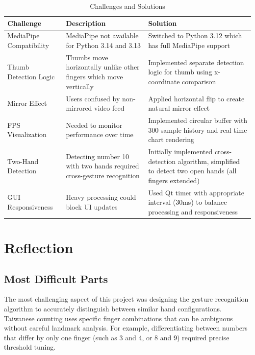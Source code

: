 \documentclass{article}
\begin{document}
\begin{table}[H]
\centering
\begin{tabular}{|p{}|p{}|p{}|}
	\hline
	\textbf{Challenge} & \textbf{Description} & \textbf{Solution} \\\hline
	MediaPipe Compatibility & MediaPipe not available for Python 3.14 and 3.13 & Switched to Python 3.12 which has full MediaPipe support \\\hline
	Thumb Detection Logic & Thumbs move horizontally unlike other fingers which move vertically & Implemented separate detection logic for thumb using x-coordinate comparison \\\hline
	Mirror Effect & Users confused by non-mirrored video feed & Applied horizontal flip to create natural mirror effect \\\hline
	FPS Visualization & Needed to monitor performance over time & Implemented circular buffer with 300-sample history and real-time chart rendering \\\hline
	Two-Hand Detection & Detecting number 10 with two hands required cross-gesture recognition & Initially implemented cross-detection algorithm, simplified to detect two open hands (all fingers extended) \\\hline
	GUI Responsiveness & Heavy processing could block UI updates & Used Qt timer with appropriate interval (30ms) to balance processing and responsiveness \\\hline
\end{tabular}
\caption{Challenges and Solutions}
\end{table}

\section{Reflection}

\subsection{Most Difficult Parts}

The most challenging aspect of this project was designing the gesture recognition algorithm to accurately distinguish between similar hand configurations. Taiwanese counting uses specific finger combinations that can be ambiguous without careful landmark analysis. For example, differentiating between numbers that differ by only one finger (such as 3 and 4, or 8 and 9) required precise threshold tuning.
\end{document}

